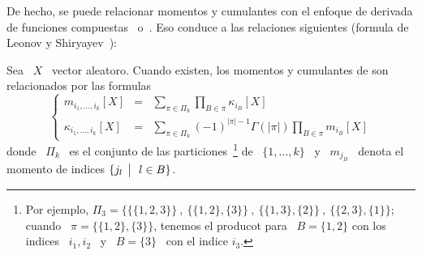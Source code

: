 {%
%
De hecho, se  puede relacionar momentos y cumulantes con  el enfoque de derivada
de funciones  compuestas~\cite[Teo.~5.1.4]{Sta99} o~\cite{Har06}. Eso  conduce a
las relaciones siguientes (formula  de Leonov y Shiryayev~\cite{LeoShi59, Shi84,
  LacAmb97, Bri01}):
%
\begin{lema}%
%
  Sea \ $X$ \ vector aleatoro.  Cuando existen, los momentos y cumulantes de son
  relacionados por las formulas
  \[\left\{\begin{array}{lll}
  m_{i_1,\ldots,i_k}[X] & = & \displaystyle \sum_{\pi \in \Pi_k} \prod_{B \in
  \pi} \kappa_{i_B}[X] \\[5mm]
  \kappa_{i_1,\ldots,i_k}[X] & = & \displaystyle \sum_{\pi \in \Pi_k}
  (-1)^{|\pi|-1} \Gamma(|\pi|) \prod_{B \in \pi} m_{i_B}[X]
  \end{array}\right.\]
  donde \  $\Pi_k$ \  es el conjunto  de las  particiones~\footnote{Por ejemplo,
    $\Pi_3  = \Big\{  \big\{ \{1,2,3\}  \big\} \:  , \:  \big\{ \{1,2\}  , \{3\}
    \big\} \: , \: \big\{ \{1,3\} ,  \{2\} \big\} \: , \: \big\{ \{2,3\} , \{1\}
    \big\}$; cuando \ $\pi = \big\{ \{1,2\} , \{3\} \Big\}$, tenemos el producot
    para \ $B = \{1,2\}$ con los indices \  $i_1,i_2$ \ y \ $B = \{3\}$ \ con el
    indice $i_3$.}  de \ $\{  1 ,  \ldots , k  \}$ \ y  \ $m_{j_B}$ \  denota el
  momento de indices $\{ j_l \:\: \big| \:\: \: l \in B \}$.


\end{lema}}
